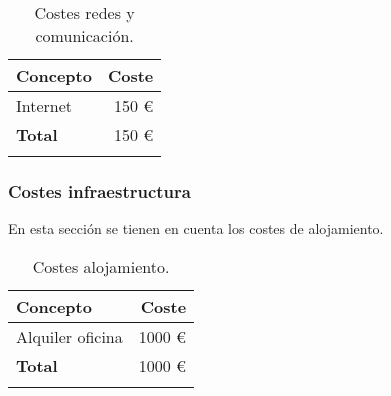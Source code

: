 \begin{longtable}[]{@{}lr@{}}
\toprule
\begin{minipage}[b]{0.38\columnwidth}\raggedright\strut
\textbf{Concepto}\strut
\end{minipage} & \begin{minipage}[b]{0.20\columnwidth}\raggedright\strut
\textbf{Coste}\strut
\end{minipage}\tabularnewline
\midrule
\endhead

\begin{minipage}[t]{0.38\columnwidth}\raggedright\strut
Internet \cite{pago:int} \strut
\end{minipage} & \begin{minipage}[t]{0.20\columnwidth}\raggedright\strut
150 \euro{}\strut
\end{minipage}\tabularnewline

\midrule

\begin{minipage}[t]{0.38\columnwidth}\raggedright\strut
\textbf{Total}\strut
\end{minipage} & \begin{minipage}[t]{0.20\columnwidth}\raggedright\strut
150 \euro{}\strut
\end{minipage}\tabularnewline
\bottomrule
\caption{Costes redes y comunicación.}
\end{longtable}

\subsubsection{Costes infraestructura}

En esta sección se tienen en cuenta los costes de alojamiento.

\begin{longtable}[]{@{}lr@{}}
\toprule
\begin{minipage}[b]{0.38\columnwidth}\raggedright\strut
\textbf{Concepto}\strut
\end{minipage} & \begin{minipage}[b]{0.20\columnwidth}\raggedright\strut
\textbf{Coste}\strut
\end{minipage}\tabularnewline
\midrule
\endhead

\begin{minipage}[t]{0.38\columnwidth}\raggedright\strut
Alquiler oficina \cite{pago:alq} \strut
\end{minipage} & \begin{minipage}[t]{0.20\columnwidth}\raggedright\strut
1000 \euro{}\strut
\end{minipage}\tabularnewline

\midrule

\begin{minipage}[t]{0.38\columnwidth}\raggedright\strut
\textbf{Total}\strut
\end{minipage} & \begin{minipage}[t]{0.20\columnwidth}\raggedright\strut
1000 \euro{}\strut
\end{minipage}\tabularnewline
\bottomrule
\caption{Costes alojamiento.}
\end{longtable}

